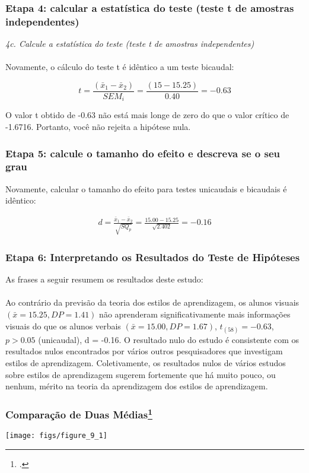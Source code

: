 \documentclass[11pt]{beamer}
\begin{document}
\begin{frame}
\frametitle{Etapa 4: calcular a estatística do teste (teste t de amostras independentes)}
\textit{4c. Calcule a estatística do teste (teste t de amostras independentes)}\\~\\

Novamente, o cálculo do teste t é idêntico a um teste bicaudal:

\[t = \frac{(\bar{x}_1 - \bar{x}_2)}{SEM_i} = \frac{(15 - 15.25)}{0.40} = -0.63\]

O valor t obtido de -0.63 não está mais longe de zero do que o valor crítico de -1.6716. Portanto, você não rejeita a hipótese nula.
\end{frame}

\begin{frame}
\frametitle{Etapa 5: calcule o tamanho do efeito e descreva se o seu grau}
Novamente, calcular o tamanho do efeito para testes unicaudais e bicaudais é idêntico:
 
\begin{align*}
d = \frac{\bar{x}_1 - \bar{x}_2}{\sqrt{SQ_p}} = \frac{15.00-15.25}{\sqrt{2.402}} = -0.16
\end{align*}

\end{frame}


\begin{frame}
\frametitle{Etapa 6: Interpretando os Resultados do Teste de Hipóteses}

As frases a seguir resumem os resultados deste estudo:\\~\\

Ao contrário da previsão da teoria dos estilos de aprendizagem, os alunos visuais $(\bar{x} = 15.25, DP = 1.41)$ não aprenderam significativamente mais informações visuais do que os alunos verbais $(\bar{x} = 15.00, DP = 1.67)$, $t_{(58)} = -0.63$, $p > 0.05$ (unicaudal), d = -0.16. O resultado nulo do estudo é consistente com os resultados nulos encontrados por vários outros pesquisadores que investigam estilos de aprendizagem. Coletivamente, os resultados nulos de vários estudos sobre estilos de aprendizagem sugerem fortemente que há muito pouco, ou nenhum, mérito na teoria da aprendizagem dos estilos de aprendizagem.

\end{frame}

\begin{frame}
\frametitle{Comparação de Duas Médias\footcite{magalhaes2002noccoes}}

\begin{center}\texttt{[image: figs/figure\_9\_1]} \end{center}
\end{frame}
\end{document}
